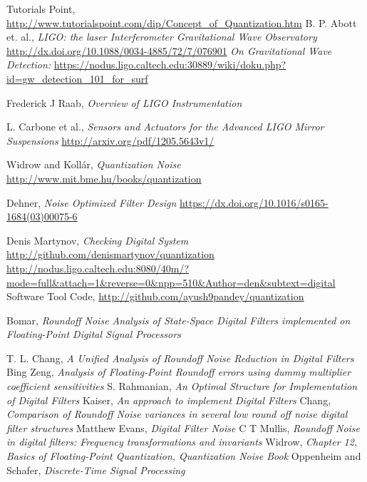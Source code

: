 \documentclass[colorlinks=true,pdfstartview=FitV,linkcolor=blue,
            citecolor=red,urlcolor=magenta]{ligodoc}
\begin{document}
\begin{thebibliography}{100}  

 Tutorials Point, \url{http://www.tutorialspoint.com/dip/Concept_of_Quantization.htm}
 B. P. Abott et. al.,  
				\emph{LIGO: the laser Interferometer Gravitational Wave Observatory} 							\url{http://dx.doi.org/10.1088/0034-4885/72/7/076901}
 \emph{On Gravitational Wave Detection: }
			\url{https://nodus.ligo.caltech.edu:30889/wiki/doku.php?id=gw_detection_101_for_surf}

 Frederick J Raab, \emph{Overview of LIGO Instrumentation}

 L. Carbone et al., \emph{Sensors and Actuators for the Advanced LIGO Mirror Suspensions}
									\url{http://arxiv.org/pdf/1205.5643v1/}
									
 Widrow and Koll\'ar, \emph{Quantization Noise} 				\url{http://www.mit.bme.hu/books/quantization}

 Dehner, \emph{Noise Optimized Filter Design} 		\url{https://dx.doi.org/10.1016/s0165-1684(03)00075-6}


 Denis Martynov, \emph{Checking Digital System} \url{http://github.com/denismartynov/quantization}
\url{http://nodus.ligo.caltech.edu:8080/40m/?mode=full&attach=1&reverse=0&npp=510&Author=den&subtext=digital}  
 Software Tool Code, \url{http://github.com/ayush9pandey/quantization}

 Bomar, \emph{Roundoff Noise Analysis of State-Space Digital Filters implemented on Floating-Point Digital Signal Processors}

 T. L. Chang, \emph{A Unified Analysis of Roundoff Noise Reduction in Digital Filters}
 Bing Zeng, \emph{Analysis of Floating-Point Roundoff errors using dummy multiplier coefficient sensitivities}
 S. Rahmanian, \emph{An Optimal Structure for Implementation of Digital Filters}
 Kaiser, \emph{An approach to implement Digital Filters}
 Chang, \emph{Comparison of Roundoff Noise variances in several low round off noise digital filter structures}
 Matthew Evans, \emph{Digital Filter Noise}
C T Mullis, \emph{Roundoff Noise in digital filters: Frequency transformations and invariants}
 Widrow, \emph{Chapter 12, Basics of Floating-Point Quantization, Quantization Noise Book}
 Oppenheim and Schafer, \emph{Discrete-Time Signal Processing}


\end{thebibliography}
\end{document}
